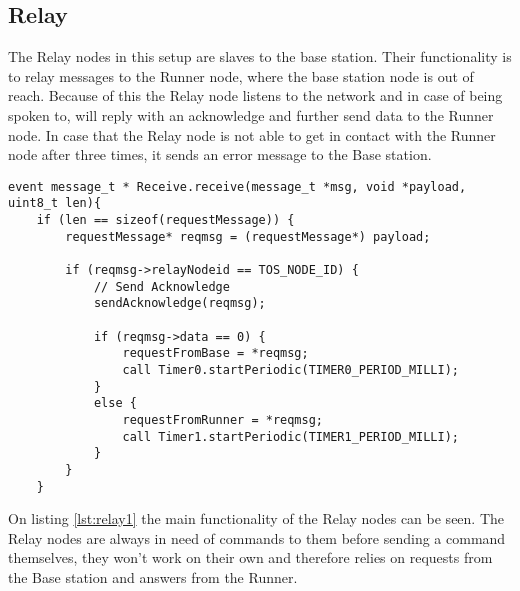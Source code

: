 \subsection{Relay}\label{sc:relay}
The Relay nodes in this setup are slaves to the base station. Their functionality is to relay messages to the Runner node, where the base station node is out of reach. Because of this the Relay node listens to the network and in case of being spoken to, will reply with an acknowledge and further send data to the Runner node. In case that the Relay node is not able to get in contact with the Runner node after three times, it sends an error message to the Base station.

\begin{minipage}[t]{0.95\linewidth}
	\begin{lstlisting}[caption=Receive message event of Relay., label={lst:relay1}]
event message_t * Receive.receive(message_t *msg, void *payload, uint8_t len){
	if (len == sizeof(requestMessage)) {
		requestMessage* reqmsg = (requestMessage*) payload;
		
		if (reqmsg->relayNodeid == TOS_NODE_ID) {
			// Send Acknowledge
			sendAcknowledge(reqmsg);
			
			if (reqmsg->data == 0) {	
				requestFromBase = *reqmsg;
				call Timer0.startPeriodic(TIMER0_PERIOD_MILLI);		
			}
			else {
				requestFromRunner = *reqmsg;
				call Timer1.startPeriodic(TIMER1_PERIOD_MILLI);
			}
		}
	}
	\end{lstlisting}
\end{minipage}

\noindent On listing \ref{lst:relay1} the main functionality of the Relay nodes can be seen. The Relay nodes are always in need of commands to them before sending a command themselves, they won't work on their own and therefore relies on requests from the Base station and answers from the Runner.